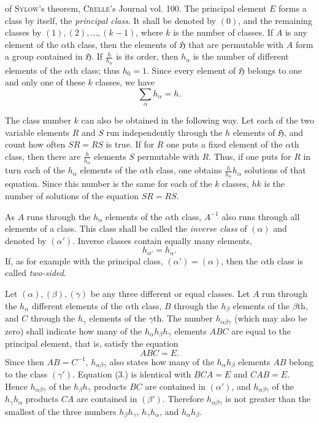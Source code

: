 \documentclass[11pt]{article}
\newcommand{\grp}{\mathfrak{H}}
\begin{document}
of \textsc{Sylow}'s theorem, \textsc{Crelle}'s Journal vol. 100. The principal element $E$ forms a class by itself, the \emph{principal class}. It shall be denoted by $(0)$, and the remaining classes by $(1),(2),\ldots,(k-1)$, where $k$ is the number of classes. If $A$ is any element of the $\alpha$th class, then the elements of $\grp$ that are permutable with $A$ form a group contained in $\grp$. If $\frac{h}{h_\alpha}$ is its order, then $h_\alpha$ is the number of different elements of the $\alpha$th class; thus $h_0=1$. Since every element of $\grp$ belongs to one and only one of these $k$ classes, we have
\begin{equation*}\tag{1.}
\sum_\alpha h_\alpha=h.
\end{equation*}

The class number $k$ can also be obtained in the following way. Let each of the two variable elements $R$ and $S$ run independently through the $h$ elements of $\grp$, and count how often $SR=RS$ is true. If for $R$ one puts a fixed element of the $\alpha$th class, then there are $\frac{h}{h_\alpha}$ elements $S$ permutable with $R$. Thus, if one puts for $R$ in turn each of the $h_\alpha$ elements of the $\alpha$th class, one obtains $\frac{h}{h_\alpha}h_\alpha$ solutions of that equation. Since this number is the same for each of the $k$ classes, $hk$ is the number of solutions of the equation $SR=RS$.

As $A$ runs through the $h_\alpha$ elements of the $\alpha$th class, $A^{-1}$ also runs through all elements of a class. This class shall be called the \emph{inverse class} of $(\alpha)$ and denoted by $(\alpha')$. Inverse classes contain equally many elements,
\begin{equation*}\tag{2.}
h_{\alpha'}=h_\alpha.
\end{equation*}
If, as for example with the principal class, $(\alpha')=(\alpha)$, then the $\alpha$th class is called \emph{two-sided}.

Let $(\alpha),(\beta),(\gamma)$ be any three different or equal classes. Let $A$ run through the $h_\alpha$ different elements of the $\alpha$th class, $B$ through the $h_\beta$ elements of the $\beta$th, and $C$ through the $h_\gamma$ elements of the $\gamma$th. The number $h_{\alpha\beta\gamma}$ (which may also be zero) shall indicate how many of the $h_\alpha h_\beta h_\gamma$ elements $ABC$ are equal to the principal element, that is, satisfy the equation
\begin{equation*}\tag{3.}
ABC=E.
\end{equation*}
Since then $AB=C^{-1}$, $h_{\alpha\beta\gamma}$ also states how many of the $h_\alpha h_\beta$ elements $AB$ belong to the class $(\gamma')$. Equation (3.) is identical with $BCA=E$ and $CAB=E$. Hence $h_{\alpha\beta\gamma}$ of the $h_\beta h_\gamma$ products $BC$ are contained in $(\alpha')$, and $h_{\alpha\beta\gamma}$ of the $h_\gamma h_\alpha$ products $CA$ are contained in $(\beta')$. Therefore $h_{\alpha\beta\gamma}$ is not greater than the smallest of the three numbers $h_\beta h_\gamma$, $h_\gamma h_\alpha$, and $h_\alpha h_\beta$.
\end{document}
